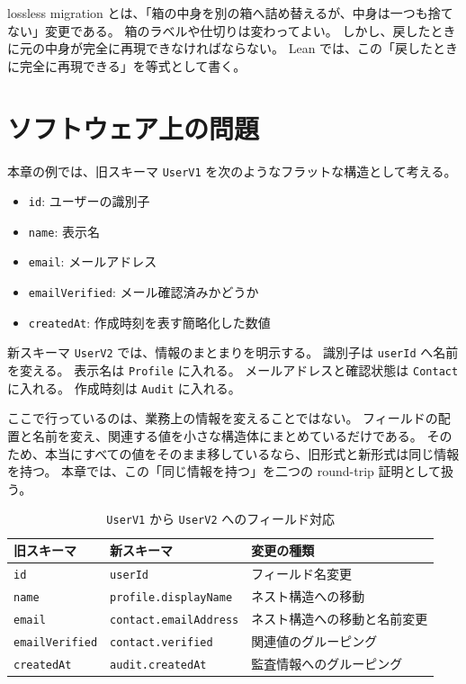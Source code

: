 \begin{intuitionbox}
lossless migration とは、「箱の中身を別の箱へ詰め替えるが、中身は一つも捨てない」変更である。
箱のラベルや仕切りは変わってよい。
しかし、戻したときに元の中身が完全に再現できなければならない。
Lean では、この「戻したときに完全に再現できる」を等式として書く。
\end{intuitionbox}


\section{ソフトウェア上の問題}

本章の例では、旧スキーマ \texttt{UserV1} を次のようなフラットな構造として考える。

\begin{itemize}
\item \texttt{id}: ユーザーの識別子
\item \texttt{name}: 表示名
\item \texttt{email}: メールアドレス
\item \texttt{emailVerified}: メール確認済みかどうか
\item \texttt{createdAt}: 作成時刻を表す簡略化した数値
\end{itemize}

新スキーマ \texttt{UserV2} では、情報のまとまりを明示する。
識別子は \texttt{userId} へ名前を変える。
表示名は \texttt{Profile} に入れる。
メールアドレスと確認状態は \texttt{Contact} に入れる。
作成時刻は \texttt{Audit} に入れる。

\begin{softwarebox}
ここで行っているのは、業務上の情報を変えることではない。
フィールドの配置と名前を変え、関連する値を小さな構造体にまとめているだけである。
そのため、本当にすべての値をそのまま移しているなら、旧形式と新形式は同じ情報を持つ。
本章では、この「同じ情報を持つ」を二つの round-trip 証明として扱う。
\end{softwarebox}

\begin{table}[htbp]
\centering
\caption{\texttt{UserV1} から \texttt{UserV2} へのフィールド対応}
\label{tab:ch22-field-mapping}
\begin{tabular}{lll}
\toprule
旧スキーマ & 新スキーマ & 変更の種類 \\
\midrule
\texttt{id} & \texttt{userId} & フィールド名変更 \\
\texttt{name} & \texttt{profile.displayName} & ネスト構造への移動 \\
\texttt{email} & \texttt{contact.emailAddress} & ネスト構造への移動と名前変更 \\
\texttt{emailVerified} & \texttt{contact.verified} & 関連値のグルーピング \\
\texttt{createdAt} & \texttt{audit.createdAt} & 監査情報へのグルーピング \\
\bottomrule
\end{tabular}
\end{table}

